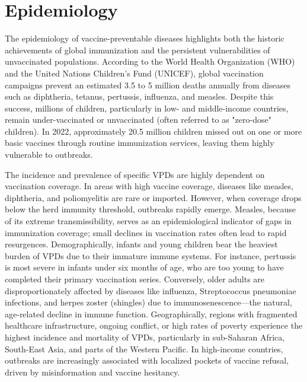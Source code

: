 \section*{Epidemiology}
The epidemiology of vaccine-preventable diseases highlights both the historic achievements of global immunization and the persistent vulnerabilities of unvaccinated populations. According to the World Health Organization (WHO) and the United Nations Children's Fund (UNICEF), global vaccination campaigns prevent an estimated 3.5 to 5 million deaths annually from diseases such as diphtheria, tetanus, pertussis, influenza, and measles. Despite this success, millions of children, particularly in low- and middle-income countries, remain under-vaccinated or unvaccinated (often referred to as "zero-dose" children). In 2022, approximately 20.5 million children missed out on one or more basic vaccines through routine immunization services, leaving them highly vulnerable to outbreaks.

The incidence and prevalence of specific VPDs are highly dependent on vaccination coverage. In areas with high vaccine coverage, diseases like measles, diphtheria, and poliomyelitis are rare or imported. However, when coverage drops below the herd immunity threshold, outbreaks rapidly emerge. Measles, because of its extreme transmissibility, serves as an epidemiological indicator of gaps in immunization coverage; small declines in vaccination rates often lead to rapid resurgences. Demographically, infants and young children bear the heaviest burden of VPDs due to their immature immune systems. For instance, pertussis is most severe in infants under six months of age, who are too young to have completed their primary vaccination series. Conversely, older adults are disproportionately affected by diseases like influenza, Streptococcus pneumoniae infections, and herpes zoster (shingles) due to immunosenescence—the natural, age-related decline in immune function. Geographically, regions with fragmented healthcare infrastructure, ongoing conflict, or high rates of poverty experience the highest incidence and mortality of VPDs, particularly in sub-Saharan Africa, South-East Asia, and parts of the Western Pacific. In high-income countries, outbreaks are increasingly associated with localized pockets of vaccine refusal, driven by misinformation and vaccine hesitancy.

